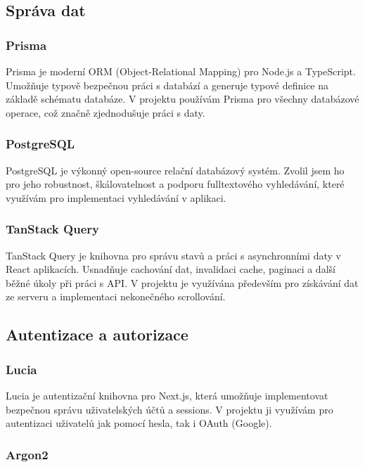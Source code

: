 \documentclass[12pt]{article}
\begin{document}
\subsection{Správa dat}

\subsubsection{Prisma}

Prisma je moderní ORM (Object-Relational Mapping) pro Node.js a TypeScript. Umožňuje typově bezpečnou práci s databází a generuje typové definice na základě schématu databáze. V projektu používám Prisma pro všechny databázové operace, což značně zjednodušuje práci s daty.

\subsubsection{PostgreSQL}

PostgreSQL je výkonný open-source relační databázový systém. Zvolil jsem ho pro jeho robustnost, škálovatelnost a podporu fulltextového vyhledávání, které využívám pro implementaci vyhledávání v aplikaci.

\subsubsection{TanStack Query}

TanStack Query je knihovna pro správu stavů a práci s asynchronními daty v React aplikacích. Usnadňuje cachování dat, invalidaci cache, paginaci a další běžné úkoly při práci s API. V projektu je využívána především pro získávání dat ze serveru a implementaci nekonečného scrollování.

\subsection{Autentizace a autorizace}

\subsubsection{Lucia}

Lucia je autentizační knihovna pro Next.js, která umožňuje implementovat bezpečnou správu uživatelských účtů a sessions. V projektu ji využívám pro autentizaci uživatelů jak pomocí hesla, tak i OAuth (Google).

\subsubsection{Argon2}
\end{document}
